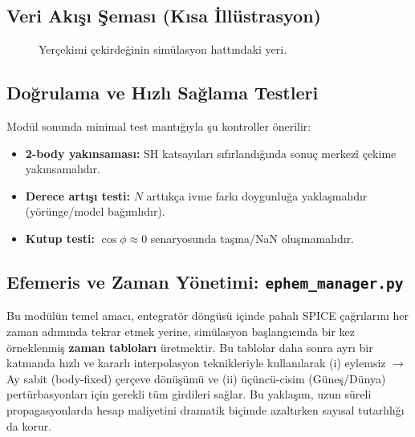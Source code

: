 \subsection*{Veri Akışı Şeması (Kısa İllüstrasyon)}

\begin{figure}[H]
\centering
{}
\caption{Yerçekimi çekirdeğinin simülasyon hattındaki yeri.}
\end{figure}

\subsection*{Doğrulama ve Hızlı Sağlama Testleri}

Modül sonunda minimal test mantığıyla şu kontroller önerilir:
\begin{itemize}
  \item \textbf{2-body yakınsaması:} SH katsayıları sıfırlandığında sonuç merkezî çekime yakınsamalıdır.
  \item \textbf{Derece artışı testi:} $N$ arttıkça ivme farkı doygunluğa yaklaşmalıdır (yörünge/model bağımlıdır).
  \item \textbf{Kutup testi:} $\cos\phi \approx 0$ senaryosunda taşma/NaN oluşmamalıdır.
\end{itemize}



\newpage
\subsection{Efemeris ve Zaman Yönetimi: \texttt{ephem\_manager.py}}
\label{subsec:ephem_manager}

Bu modülün temel amacı, entegratör döngüsü içinde pahalı SPICE çağrılarını her zaman adımında tekrar etmek yerine,
simülasyon başlangıcında bir kez örneklenmiş \textbf{zaman tabloları} üretmektir. Bu tablolar daha sonra ayrı bir katmanda hızlı ve kararlı interpolasyon teknikleriyle kullanılarak
(i) eylemsiz $\rightarrow$ Ay sabit (body-fixed) çerçeve dönüşümü ve (ii) üçüncü-cisim (Güneş/Dünya) pertürbasyonları için gerekli tüm girdileri sağlar. Bu yaklaşım, uzun süreli propagasyonlarda hesap maliyetini dramatik biçimde azaltırken sayısal tutarlılığı da korur.

